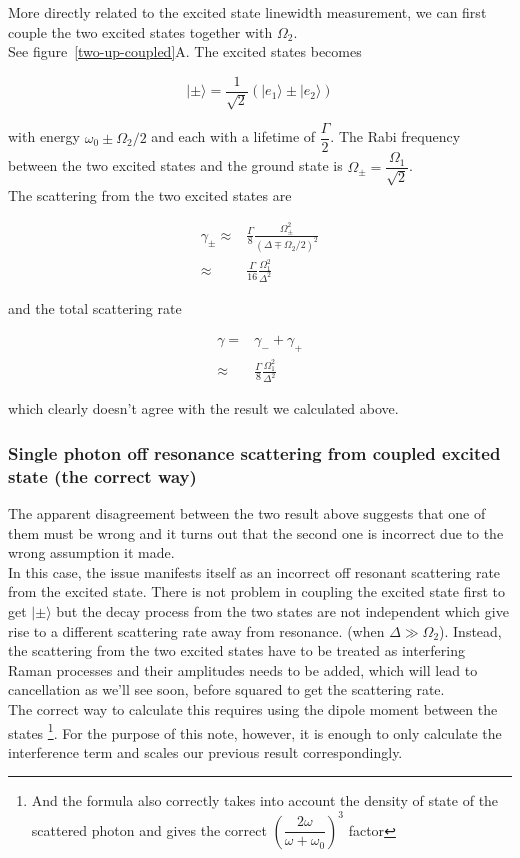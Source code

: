 \documentclass[10pt,fleqn]{article}
\newcommand{\eqar}[1]
{
  \begin{align*}
    #1
  \end{align*}
}
\newcommand{\paren}[1]{{\left({#1}\right)}}
\begin{document}
More directly related to the excited state linewidth measurement, we can first couple the
two excited states together with $\Omega_2$.\\

See \mbox{figure \ref{two-up-coupled}A}. The excited states becomes

\[|\pm\rangle=\frac{1}{\sqrt2}\paren{|e_1\rangle\pm|e_2\rangle}\]

with energy $\omega_0\pm\Omega_2/2$ and each with a lifetime of $\dfrac\Gamma2$.
The Rabi frequency between the two excited states and the ground state is
$\Omega_\pm=\dfrac{\Omega_1}{\sqrt2}$.\\
The scattering from the two excited states are
\eqar{
  \gamma_\pm\approx&\frac{\Gamma}{8}\frac{\Omega_\pm^2}{\paren{\Delta\mp\Omega_2/2}^2}\\
  \approx&\frac{\Gamma}{16}\frac{\Omega_1^2}{\Delta^2}
}
and the total scattering rate
\eqar{
  \gamma=&\gamma_-+\gamma_+\\
  \approx&\frac{\Gamma}{8}\frac{\Omega_1^2}{\Delta^2}
}
which clearly doesn't agree with the result we calculated above.

\subsubsection{Single photon off resonance scattering from coupled excited state
  (the correct way)}

The apparent disagreement between the two result above suggests that one of them must be wrong
and it turns out that the second one is incorrect due to the wrong assumption it made.\\

In this case, the issue manifests itself as an incorrect off resonant scattering rate
from the excited state. There is not problem in coupling the excited state first to get
$|\pm\rangle$ but the decay process from the two states are not independent which give rise
to a different scattering rate away from resonance. (when $\Delta\gg\Omega_2$).
Instead, the scattering from the two excited states have to be treated as interfering
Raman processes and their amplitudes needs to be added, which will lead to cancellation
as we'll see soon, before squared to get the scattering rate.\\

The correct way to calculate this requires using the dipole moment between the states
\footnote{And the formula also correctly takes into account the density of state of
  the scattered photon and gives the correct
  $\paren{\dfrac{2\omega}{\omega+\omega_0}}^3$ factor}.
For the purpose of this note, however, it is enough to only calculate the interference term
and scales our previous result correspondingly.\\
\end{document}
